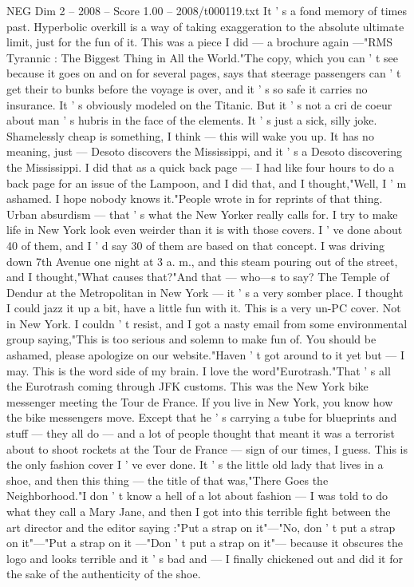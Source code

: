 \begin{textsample}{NEG Dim 2 – 2008 – Score 1.00 – 2008/t000119.txt}
It ' s a fond memory of times past.
Hyperbolic overkill is a way of taking exaggeration to the absolute ultimate limit, just for the fun of it.
This was a piece I did — a brochure again —"RMS Tyrannic : The Biggest Thing in All the World."The copy, which you can ' t see because it goes on and on for several pages, says that steerage passengers can ' t get their to bunks before the voyage is over, and it ' s so safe it carries no insurance.
It ' s obviously modeled on the Titanic.
But it ' s not a cri de coeur about man ' s hubris in the face of the elements.
It ' s just a sick, silly joke.
Shamelessly cheap is something, I think — this will wake you up.
It has no meaning, just — Desoto discovers the Mississippi, and it ' s a Desoto discovering the Mississippi.
I did that as a quick back page — I had like four hours to do a back page for an issue of the Lampoon, and I did that, and I thought,"Well, I ' m ashamed.
I hope nobody knows it."People wrote in for reprints of that thing.
Urban absurdism — that ' s what the New Yorker really calls for.
I try to make life in New York look even weirder than it is with those covers.
I ' ve done about 40 of them, and I ' d say 30 of them are based on that concept.
I was driving down 7th Avenue one night at 3 a. m., and this steam pouring out of the street, and I thought,"What causes that?"And that — who—s to say?
The Temple of Dendur at the Metropolitan in New York — it ' s a very somber place.
I thought I could jazz it up a bit, have a little fun with it.
This is a very un-PC cover.
Not in New York.
I couldn ' t resist, and I got a nasty email from some environmental group saying,"This is too serious and solemn to make fun of.
You should be ashamed, please apologize on our website."Haven ' t got around to it yet but — I may.
This is the word side of my brain.
I love the word"Eurotrash."That ' s all the Eurotrash coming through JFK customs.
This was the New York bike messenger meeting the Tour de France.
If you live in New York, you know how the bike messengers move.
Except that he ' s carrying a tube for blueprints and stuff — they all do — and a lot of people thought that meant it was a terrorist about to shoot rockets at the Tour de France — sign of our times, I guess.
This is the only fashion cover I ' ve ever done.
It ' s the little old lady that lives in a shoe, and then this thing — the title of that was,"There Goes the Neighborhood."I don ' t know a hell of a lot about fashion — I was told to do what they call a Mary Jane, and then I got into this terrible fight between the art director and the editor saying :"Put a strap on it"—"No, don ' t put a strap on it"—"Put a strap on it —"Don ' t put a strap on it"— because it obscures the logo and looks terrible and it ' s bad and — I finally chickened out and did it for the sake of the authenticity of the shoe.

\end{textsample}
